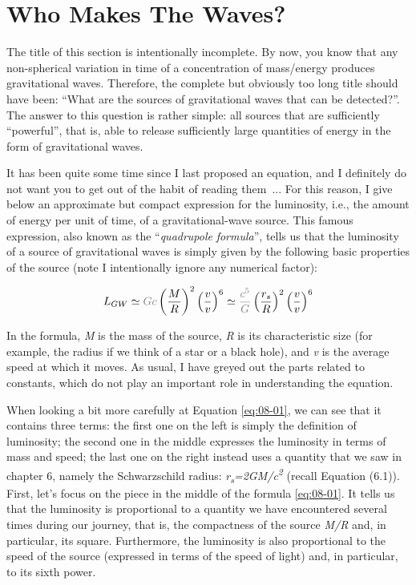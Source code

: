 \section{Who Makes The Waves?}\label{sec:08-sources}

The title of this section is intentionally incomplete. By now, you know that any
non-spherical variation in time of a concentration of
mass/energy produces gravitational waves.
Therefore, the complete but obviously too long title should have been: ``What are the
sources of gravitational waves that can be detected?''. The answer to
this question is rather simple: all sources that are sufficiently ``powerful'', that is,
able to release sufficiently large quantities of energy in the form of gravitational
waves.

It has been quite some time since I last proposed an equation, and I definitely do not
want you to get out of the habit of reading them~... For this reason, I give below an
approximate but compact expression for the luminosity, i.e., the
amount of energy per unit of time, of a gravitational-wave source. This famous
expression, also known as the ``\emph{quadrupole} \emph{formula}'',
tells us that the luminosity of a source of gravitational waves is simply given by the
following basic properties of the source (note I intentionally ignore any numerical
factor):

\begin{equation}\label{eq:08-01}
L_{GW} \simeq \textcolor{gray}{Gc}\left( \frac{M}{R} \right)^{2}\left( \frac{v}{v} \right)^{6} \simeq \textcolor{gray}{\frac{c^{5}}{G}}\left( \frac{r_{s}}{R} \right)^{2}\left( \frac{v}{v} \right)^{6}
\end{equation}

In the formula, \emph{M} is the mass of the source, \emph{R} is its characteristic size
(for example, the radius if we think of a star or a black hole), and \emph{v} is the
average speed at which it moves. As usual, I have greyed out the parts related to
constants, which do not play an important role in understanding the equation.

When looking a bit more carefully at Equation \eqref{eq:08-01}, we can see that it contains three
terms: the first one on the left is simply the definition of luminosity; the second one
in the middle expresses the luminosity in terms of mass and speed; the last one on the
right instead uses a quantity that we saw in chapter 6, namely the Schwarzschild radius:
\emph{r\textsubscript{s}=2GM/c\textsuperscript{2 }}(recall Equation (6.1)). First, let's
focus on the piece in the middle of the formula \eqref{eq:08-01}. It tells us that the luminosity
is proportional to a quantity we have encountered several times during our journey, that
is, the compactness of the source \emph{M/R} and, in particular, its square.
Furthermore, the luminosity is also proportional to the speed of the source (expressed
in terms of the speed of light) and, in particular, to its sixth power.

